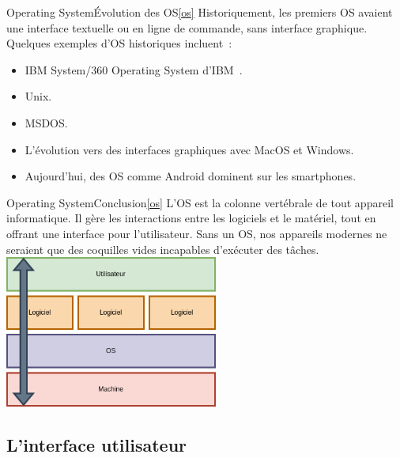 \documentclass{beamer}
\begin{document}
    \begin{frame}{Operating System}{Évolution des OS\cref{os}}
        Historiquement, les premiers OS avaient une interface textuelle ou en ligne de commande, sans interface graphique.
        Quelques exemples d'OS historiques incluent~:
        \begin{itemize}
            \item IBM System/360 Operating System d'IBM~.
            \item Unix.
            \item MSDOS.
            \item L'évolution vers des interfaces graphiques avec MacOS et Windows.
            \item Aujourd'hui, des OS comme Android dominent sur les smartphones.
        \end{itemize}
    \end{frame}

    \begin{frame}{Operating System}{Conclusion\cref{os}}
        L'OS est la colonne vertébrale de tout appareil informatique.
        Il gère les interactions entre les logiciels et le matériel, tout en offrant une interface pour l'utilisateur.
        Sans un OS, nos appareils modernes ne seraient que des coquilles vides incapables d'exécuter des tâches.
        \bigbreak
        \centering
        \includegraphics[width=7cm]{image/os.drawio}
    \end{frame}

    \subsection{L'interface utilisateur}\label{subsec:hmi}
\end{document}
